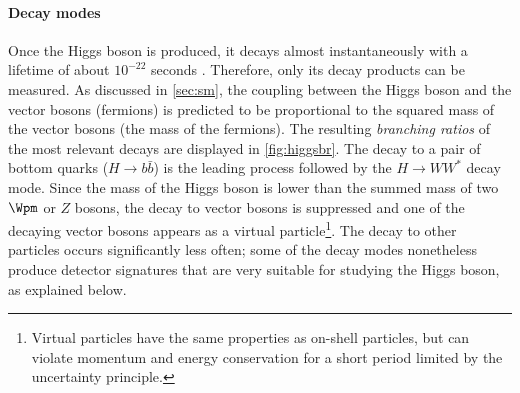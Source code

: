 \paragraph{Decay modes}
Once the Higgs boson is produced, it decays almost instantaneously with a lifetime of about $10^{-22}$ seconds \cite{PDG2020}.
Therefore, only its decay products can be measured.
As discussed in \cref{sec:sm}, the coupling between the Higgs boson and the vector bosons (fermions) is predicted to be proportional to the squared mass of the vector bosons (the mass of the fermions). The resulting \emph{branching ratios} of the most relevant decays are displayed in \cref{fig:higgsbr}. 
The decay to a pair of bottom quarks ($H\rightarrow b\bar{b}$) is the leading process followed by the $H\rightarrow WW^*$ decay mode. Since the mass of the Higgs boson is lower than the summed mass of two $\Wpm$ or $Z$ bosons, the decay to vector bosons is suppressed and one of the decaying vector bosons appears as a virtual particle\footnote{Virtual particles have the same properties as on-shell particles, but can violate momentum and energy conservation for a short period limited by the uncertainty principle.}. The decay to other particles occurs significantly less often; some of the decay modes nonetheless produce detector signatures that are very suitable for studying the Higgs boson, as explained below.

